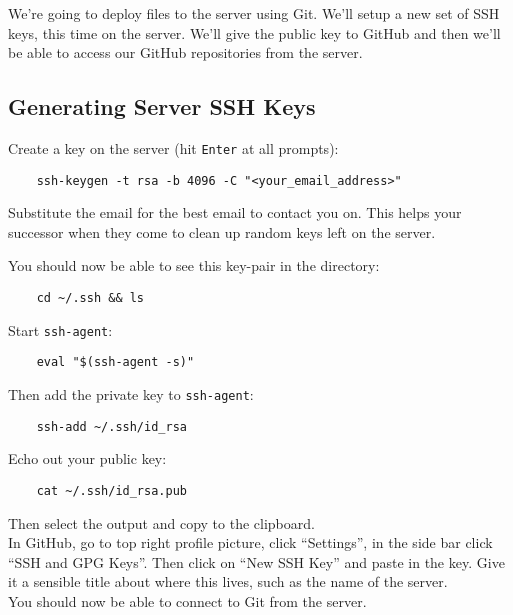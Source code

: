 We're going to deploy files to the server using Git. We'll setup a new set of SSH keys, this time on the server. We'll give the public key to GitHub and then we'll be able to access our GitHub repositories from the server.


\subsection{Generating Server SSH Keys}

Create a key on the server (hit \texttt{Enter} at all prompts):

\begin{verbatim}
    ssh-keygen -t rsa -b 4096 -C "<your_email_address>"
\end{verbatim}

Substitute the email for the best email to contact you on. This helps your successor when they come to clean up random keys left on the server.

\pagebreak

You should now be able to see this key-pair in the directory:

\begin{verbatim}
    cd ~/.ssh && ls
\end{verbatim}

Start \texttt{ssh-agent}:

\begin{verbatim}
    eval "$(ssh-agent -s)"
\end{verbatim}

Then add the private key to \texttt{ssh-agent}:

\begin{verbatim}
    ssh-add ~/.ssh/id_rsa
\end{verbatim}

Echo out your public key:

\begin{verbatim}
    cat ~/.ssh/id_rsa.pub
\end{verbatim}

Then select the output and copy to the clipboard.
\\

In GitHub, go to top right profile picture, click ``Settings'', in the side bar click ``SSH and GPG Keys''. Then click on ``New SSH Key'' and paste in the key. Give it a sensible title about where this lives, such as the name of the server.
\\

You should now be able to connect to Git from the server.



